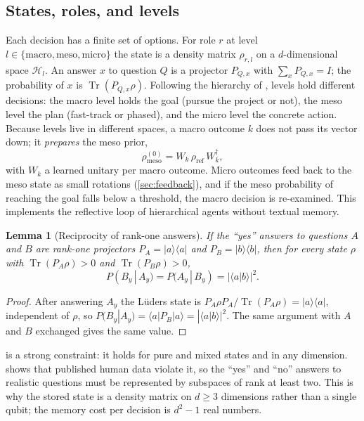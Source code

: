 \documentclass[11pt]{article}
\newtheorem{lemma}{Lemma}
\theoremstyle{definition}
\theoremstyle{remark}
\newcommand{\ket}[1]{\lvert #1\rangle}
\newcommand{\bra}[1]{\langle #1\rvert}
\newcommand{\tr}{\operatorname{Tr}}
\begin{document}
\subsection{States, roles, and levels}
Each decision has a finite set of options. For role $r$ at level $l\in\{\text{macro},\text{meso},\text{micro}\}$ the state is a density matrix $\rho_{r,l}$ on a $d$-dimensional space $\mathcal{H}_l$. An answer $x$ to question $Q$ is a projector $P_{Q,x}$ with $\sum_x P_{Q,x}=I$; the probability of $x$ is $\tr(P_{Q,x}\rho)$. Following the hierarchy of \citet{li2025narrative}, levels hold different decisions: the macro level holds the goal (pursue the project or not), the meso level the plan (fast-track or phased), and the micro level the concrete action. Because levels live in different spaces, a macro outcome $k$ does not pass its vector down; it \emph{prepares} the meso prior,
\begin{equation}
\rho_{\text{meso}}^{(0)} = W_k\,\rho_{\text{ref}}\,W_k^\dagger ,
\label{eq:prep}
\end{equation}
with $W_k$ a learned unitary per macro outcome. Micro outcomes feed back to the meso state as small rotations (\cref{sec:feedback}), and if the meso probability of reaching the goal falls below a threshold, the macro decision is re-examined. This implements the reflective loop of hierarchical agents \citep{li2025narrative,bougie2026cityreal} without textual memory.

\begin{lemma}[Reciprocity of rank-one answers]
\label{lem:recip}
If the ``yes'' answers to questions $A$ and $B$ are rank-one projectors $P_A=\ket{a}\!\bra{a}$ and $P_B=\ket{b}\!\bra{b}$, then for every state $\rho$ with $\tr(P_A\rho)>0$ and $\tr(P_B\rho)>0$,
\[
P(B_y\,|\,A_y)=P(A_y\,|\,B_y)=|\langle a|b\rangle|^2 .
\]
\end{lemma}
\begin{proof}
After answering $A_y$ the L\"uders state is $P_A\rho P_A/\tr(P_A\rho)=\ket{a}\!\bra{a}$, independent of $\rho$, so $P(B_y|A_y)=\bra{a}P_B\ket{a}=|\langle a|b\rangle|^2$. The same argument with $A$ and $B$ exchanged gives the same value.
\end{proof}

 is a strong constraint: it holds for pure and mixed states and in any dimension.  shows that published human data violate it, so the ``yes'' and ``no'' answers to realistic questions must be represented by subspaces of rank at least two. This is why the stored state is a density matrix on $d\ge 3$ dimensions rather than a single qubit; the memory cost per decision is $d^2-1$ real numbers.
\end{document}
